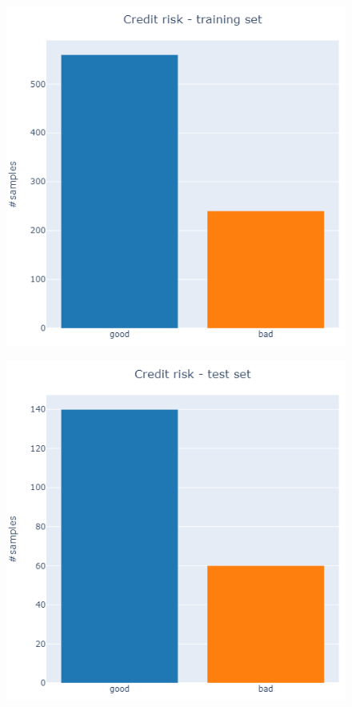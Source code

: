 \documentclass[letterpaper]{article}
\begin{document}
	\begin{figure}[h]
		\centering
		\begin{minipage}[c]{0.40\textwidth}
			\includegraphics[width=\textwidth]{images/training_set.png}
			\label{fig:9}
		\end{minipage}
		\begin{minipage}{0.05\textwidth}
			\quad
		\end{minipage}
		\begin{minipage}[c]{0.40\textwidth}
			\includegraphics[width=\textwidth]{images/test_set.png}
			\label{fig:10}
		\end{minipage}
	\end{figure}
	
\end{document}
